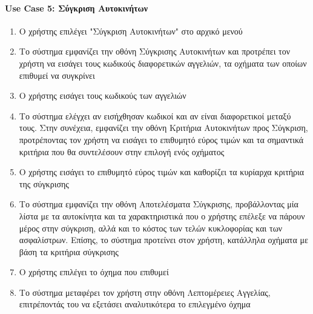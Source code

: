 \documentclass{../ol-softwaremanual}
\begin{document}
	\paragraph{}
	
	
	
	\paragraph{\en Use Case 5: \gr Σύγκριση Αυτοκινήτων}
	\begin{enumerate}
		\item Ο χρήστης επιλέγει \en"\gr Σύγκριση Αυτοκινήτων\en" \gr στο αρχικό μενού
		\item Το σύστημα εμφανίζει την οθόνη Σύγκρισης Αυτοκινήτων και προτρέπει τον χρήστη να εισάγει τους κωδικούς διαφορετικών αγγελιών, τα οχήματα των οποίων επιθυμεί να συγκρίνει
		\item Ο χρήστης εισάγει τους κωδικούς των αγγελιών
		\item Το σύστημα ελέγχει αν εισήχθησαν κωδικοί και αν είναι διαφορετικοί μεταξύ τους. Στην συνέχεια, εμφανίζει την οθόνη Κριτήρια Αυτοκινήτων προς Σύγκριση, προτρέποντας τον χρήστη να εισάγει το επιθυμητό εύρος τιμών και τα σημαντικά κριτήρια που θα συντελέσουν στην επιλογή ενός οχήματος
		\item Ο χρήστης εισάγει το επιθυμητό εύρος τιμών και καθορίζει τα κυρίαρχα κριτήρια της σύγκρισης
		\item Το σύστημα εμφανίζει την οθόνη Αποτελέσματα Σύγκρισης, προβάλλοντας μία λίστα με τα αυτοκίνητα και τα χαρακτηριστικά που ο χρήστης επέλεξε να πάρουν μέρος στην σύγκριση, αλλά και το κόστος των τελών κυκλοφορίας και των ασφαλίστρων. Επίσης, το σύστημα προτείνει στον χρήστη, κατάλληλα οχήματα με βάση τα κριτήρια σύγκρισης
		\item Ο χρήστης επιλέγει το όχημα που επιθυμεί
		\item Το σύστημα μεταφέρει τον χρήστη στην οθόνη Λεπτομέρειες Αγγελίας, επιτρέποντάς του να εξετάσει αναλυτικότερα το επιλεγμένο όχημα
	\end{enumerate}
	
\end{document}
